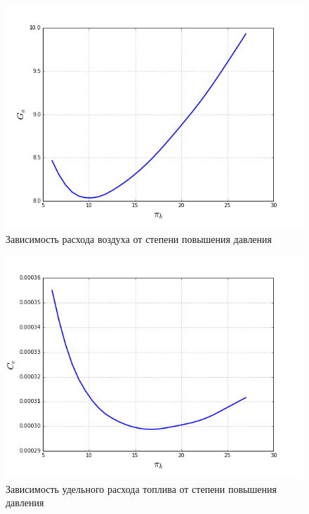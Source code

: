 \documentclass[a4paper,10pt]{article}
\begin{document}
\begin{center}


	\begin{figure}[hbtp] \centering \includegraphics[scale=0.5] {../../plots/cycle_G_air.png} \caption{Зависимость расхода воздуха от степени повышения давления} \end{figure}	
	
	\begin{figure}[hbtp] \centering \includegraphics[scale=0.5] {../../plots/cycle_C_e.png} \caption{Зависимость удельного расхода топлива от степени повышения давления} \end{figure}
	 

\end{center}
\end{document}
